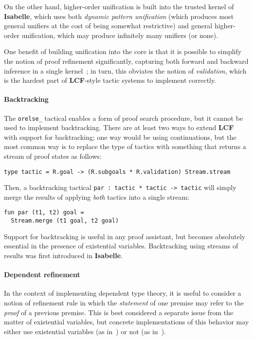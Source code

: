 \documentclass{article}
\newcommand\FormatLang[1]{{\bfseries\sffamily #1}}
\newcommand\LCF{\FormatLang{LCF}}
\newcommand\Isabelle{\FormatLang{Isabelle}}
\theoremstyle{definition}
\theoremstyle{remark}
\begin{document}
On the other hand, higher-order unification is built into the trusted
kernel of \Isabelle{}, which uses both \emph{dynamic pattern
  unification} (which produces most general unifiers at the cost of
being somewhat restrictive) and general higher-order unification,
which may produce infinitely many unifiers (or none).

One benefit of building unification into the core is that it is
possible to simplify the notion of proof refinement significantly,
capturing both forward and backward inference in a single
kernel~\cite{paulson:1998}; in turn, this obviates the notion of
\emph{validation}, which is the hardest part of \LCF{}-style tactic
systems to implement correctly.


\paragraph{Backtracking}
The \verb|orelse_| tactical enables a form of proof search procedure,
but it cannot be used to implement backtracking. There are at least
two ways to extend \LCF{} with support for backtracking; one way would
be using continuations, but the most common way is to replace the type
of tactics with something that returns a stream of proof states as
follows:
\begin{verbatim}
type tactic = R.goal -> (R.subgoals * R.validation) Stream.stream
\end{verbatim}

Then, a backtracking tactical \verb|par : tactic * tactic -> tactic|
will simply merge the results of applying \emph{both} tactics into a
single stream:
\begin{verbatim}
fun par (t1, t2) goal =
  Stream.merge (t1 goal, t2 goal)
\end{verbatim}

Support for backtracking is useful in any proof assistant, but becomes
absolutely essential in the presence of existential
variables. Backtracking using streams of results was first introduced
in \Isabelle.


\paragraph{Dependent refinement}
In the context of implementing dependent type theory, it is useful to
consider a notion of refinement rule in which the \emph{statement} of
one premise may refer to the \emph{proof} of a previous premise. This
is best considered a separate issue from the matter of existential
variables, but concrete implementations of this behavior may either
use existential variables (as in~\cite{spiwack:2011,asperti:2011}) or not (as
in~\cite{sterling-harper:2017,redprl:2016}).

\nocite{pollack:1995}


\end{document}
